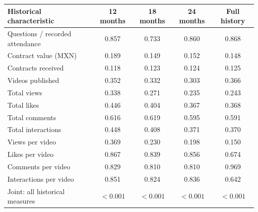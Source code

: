 \begingroup\small
\setlength{\tabcolsep}{3pt}
\renewcommand{\arraystretch}{1.25}
\noindent%
\begin{tabular*}{\linewidth}{@{\extracolsep{\fill}}lcccc@{}}
\toprule
Historical characteristic & 12 months & 18 months & 24 months & Full history \\
\midrule
Questions / recorded attendance & 0.857 & 0.733 & 0.860 & 0.868 \\
\addlinespace
Contract value (MXN) & 0.189 & 0.149 & 0.152 & 0.148 \\
Contracts received & 0.118 & 0.123 & 0.124 & 0.125 \\
\addlinespace
Videos published & 0.352 & 0.332 & 0.303 & 0.366 \\
Total views & 0.338 & 0.271 & 0.235 & 0.243 \\
Total likes & 0.446 & 0.404 & 0.367 & 0.368 \\
Total comments & 0.616 & 0.619 & 0.595 & 0.591 \\
Total interactions & 0.448 & 0.408 & 0.371 & 0.370 \\
Views per video & 0.369 & 0.230 & 0.198 & 0.150 \\
Likes per video & 0.867 & 0.839 & 0.856 & 0.674 \\
Comments per video & 0.829 & 0.810 & 0.810 & 0.969 \\
Interactions per video & 0.851 & 0.824 & 0.836 & 0.642 \\
\midrule
Joint: all historical measures & $<0.001$ & $<0.001$ & $<0.001$ & $<0.001$ \\
\bottomrule
\end{tabular*}\par\endgroup
